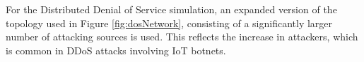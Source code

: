 For the Distributed Denial of Service simulation, an expanded version of the
topology used in Figure \ref{fig:dosNetwork}, consisting of a significantly
larger number of attacking sources is used. This reflects the increase in
attackers, which is common in DDoS attacks involving IoT botnets.
